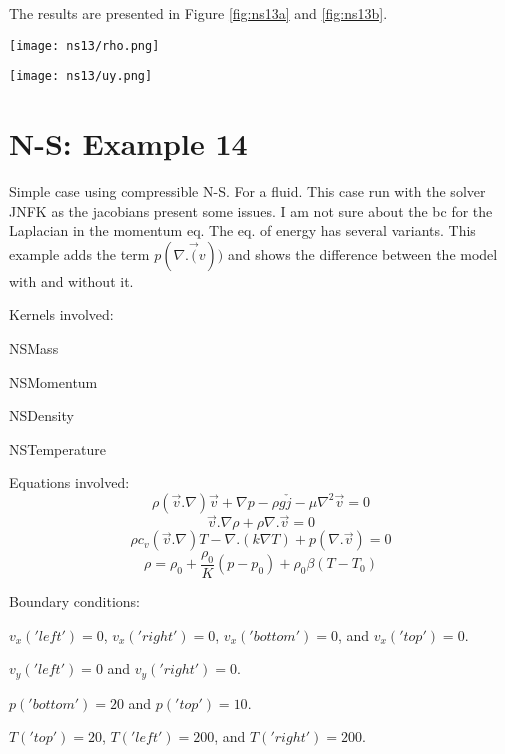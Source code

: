 \documentclass[11pt,letterpaper]{article}
\begin{document}
The results are presented in Figure \ref{fig:ns13a} and \ref{fig:ns13b}.
\begin{figure*}[!h]
	\centering
	\texttt{[image: ns13/rho.png]}
	\hfill
	\caption{Density.}
	\label{fig:ns13a}
\end{figure*}

\begin{figure*}[!h]
	\centering
	\texttt{[image: ns13/uy.png]}
	\hfill
	\caption{Velocity for changes in the density due to temperature gradient.}
	\label{fig:ns13b}
\end{figure*}

\section{N-S: Example 14}

Simple case using compressible N-S. For a fluid.
This case run with the solver JNFK as the jacobians present some issues.
I am not sure about the bc for the Laplacian in the momentum eq.
The eq. of energy has several variants.
This example adds the term $p(\nabla.\vec(v))$ and shows the difference between the model with and without it.

Kernels involved:
\begin{description}[font=$\bullet$\scshape\bfseries]
	\item[] NSMass
	\item[] NSMomentum
	\item[] NSDensity
	\item[] NSTemperature
\end{description}

Equations involved:
\begin{equation}
\rho (\vec{v}.\nabla)\vec{v} + \nabla p - \rho g \check{j} - \mu \nabla^{2}\vec{v} = 0
\end{equation}
\begin{equation}
\vec{v}.\nabla\rho+\rho\nabla.\vec{v}=0
\end{equation}
\begin{equation}
\rho c_{v} (\vec{v}.\nabla)T - \nabla .(k\nabla T) + p (\nabla . \vec{v})= 0
\end{equation}
\begin{equation}
\rho = \rho_{0} + \frac{\rho_{0}}{K}(p-p_{0}) + \rho_{0}\beta(T-T_{0})
\end{equation}

Boundary conditions:
\begin{description}[]
	\item[] $v_{x}('left')=0$, $v_{x}('right')=0$, $v_{x}('bottom')=0$, and $v_{x}('top')=0$.
	\item[] $v_{y}('left')=0$ and $v_{y}('right')=0$.
	\item[] $p('bottom')=20$ and $p('top')=10$.
	\item[] $T('top')=20$, $T('left')=200$, and $T('right')=200$.
\end{description}
\end{document}
